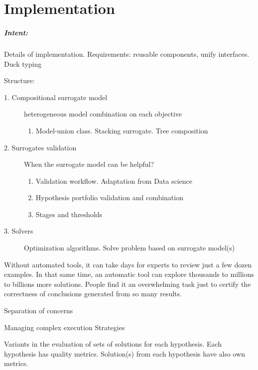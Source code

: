 \chapter{Implementation}\label{sec:implementation}

\begin{blockquote}
    \paragraph{Intent:} Details of implementation. Requirements: reusable components, unify interfaces. Duck typing 
    
    Structure:
    \begin{description}

        \item[1. Compositional surrogate model] heterogeneous model combination on each objective
        \begin{enumerate}
            \item Model-union class. Stacking surrogate. Tree composition
        \end{enumerate}

        \item[2. Surrogates validation] When the surrogate model can be helpful?
        \begin{enumerate}
            \item Validation workflow. Adaptation from Data science
            \item Hypothesis portfolio validation and combination
            \item Stages and thresholds
        \end{enumerate}

        \item[3. Solvers] Optimization algorithms. Solve problem based on surrogate model(s)
    \end{description}
\end{blockquote}

Without automated tools, it can take days for experts to review just a few dozen examples.  In that same time, an automatic tool can explore thousands to millions to billions more solutions. People find it an overwhelming task just to certify the correctness of conclusions generated from so many results.

Separation of concerns

Managing complex execution Strategies

Variants in the evaluation of sets of solutions for each hypothesis. Each hypothesis has quality metrics. Solution(s) from each hypothesis have also own metrics.
               
